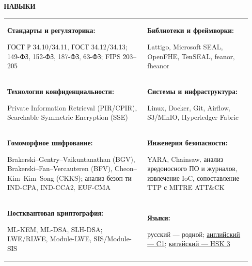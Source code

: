 \documentclass[11pt,a4paper]{article}
\newcommand{\cvrow}[2]{%
  \noindent
  \begin{minipage}[t]{0.145\textwidth}
    \vspace{0pt}%
    \raggedright
    \fontsize{8.5}{10}\selectfont
    \bfseries\MakeUppercase{#1}
  \end{minipage}%
  \hfill
  \begin{minipage}[t]{0.835\textwidth}
    \vspace{0pt}%
    #2
  \end{minipage}\par
}
\newcommand{\skillcell}[2]{%
  \textbf{#1}\par
  #2
}
\begin{document}
\cvrow{Навыки}{%
  \begin{tabularx}{\linewidth}
    {@{}>{\raggedright\arraybackslash}X
    @{\hspace{1.2em}}
    >{\raggedright\arraybackslash}X@{}}

    \skillcell{Стандарты и регуляторика:}{%
      ГОСТ Р 34.10/34.11, ГОСТ 34.12/34.13;
      149-ФЗ, 152-ФЗ, 187-ФЗ, 63-ФЗ; FIPS 203--205}
    &
    \skillcell{Библиотеки и фреймворки:}{%
      Lattigo, Microsoft SEAL, OpenFHE, TenSEAL,
      feanor, fheanor}
    \\[0.20em]

    \skillcell{Технологии конфиденциальности:}{%
      Private Information Retrieval (PIR/CPIR),
      Searchable Symmetric Encryption (SSE)}
    &
    \skillcell{Системы и инфраструктура:}{%
      Linux, Docker, Git, Airflow, S3/MinIO,
      Hyperledger Fabric}
    \\[0.20em]

    \skillcell{Гомоморфное шифрование:}{%
      Brakerski--Gentry--Vaikuntanathan (BGV),
      Brakerski--Fan--Vercauteren (BFV),
      Cheon--Kim--Kim--Song (CKKS);
      анализ безоп-ти IND-CPA, IND-CCA2, EUF-CMA}
    &
    \skillcell{Инженерия безопасности:}{%
      YARA, Chainsaw, анализ вредоносного ПО и журналов,
      извлечение IoC, сопоставление TTP с MITRE ATT\&CK}
    \\[0.20em]

    \skillcell{Постквантовая криптография:}{%
      ML-KEM, ML-DSA, SLH-DSA;
      LWE/RLWE, Module-LWE, SIS/Module-SIS}
    &
    \skillcell{Языки:}{%
      русский --- родной;
      \href{https://iasenovets.github.io/files/toefl_8cd5f4a2b8ec8f34da49ea0faeef43f1.pdf}{английский --- C1};
    \href{https://admin.chinesetest.cn/queryScore.do?sid=c2tActR9Wb\%2704b861aefbdc5e9fd0b44afa717d08cbceb0720e582ce25f\%2724d7sWsQ5nVUQSwD}
        {китайский --- HSK 3}}
  \end{tabularx}
}

\vspace{0.50em}
\end{document}

